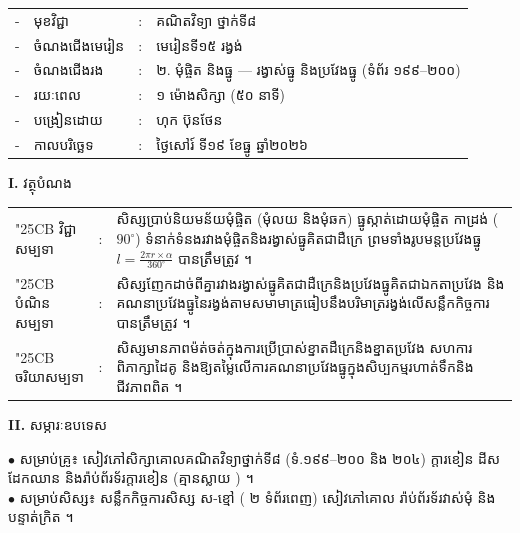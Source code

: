 \documentclass[a4paper,10pt]{article}
\newcommand{\wcirc}{{\symfont\char"25CB}}
\begin{document}
{\fontsize{10pt}{15.0pt}\selectfont
\hspace*{3.7cm}%
\begin{tabular}{@{}l l l l@{}}
  - & មុខវិជ្ជា & : & គណិតវិទ្យា ថ្នាក់ទី៨ \\
  - & ចំណងជើងមេរៀន & : & មេរៀនទី១៥ រង្វង់ \\
  - & ចំណងជើងរង & : & ២. មុំផ្ចិត និងធ្នូ — រង្វាស់ធ្នូ និងប្រវែងធ្នូ (ទំព័រ ១៩៩--២០០) \\
  - & រយៈពេល & : & ១ ម៉ោងសិក្សា (៥០ នាទី) \\
  - & បង្រៀនដោយ & : & ហុក ប៊ុនថែន \\
  - & កាលបរិច្ឆេទ & : & ថ្ងៃសៅរ៍ ទី១៩ ខែធ្នូ ឆ្នាំ២០២៦ \\
\end{tabular}

\vspace{1pt}

\textbf{I.} {\muol វត្ថុបំណង}\\[1pt]
\hspace*{0.55cm}%
\begin{tabular}{@{}l l L{14.2cm}@{}}
  \wcirc \hspace{0.25cm} វិជ្ជាសម្បទា & : & សិស្សប្រាប់និយមន័យមុំផ្ចិត (មុំលយ និងមុំឆក) ធ្នូស្កាត់ដោយមុំផ្ចិត កាដ្រង់ ($90^\circ$) ទំនាក់ទំនងរវាងមុំផ្ចិតនិងរង្វាស់ធ្នូគិតជាដឺក្រេ ព្រមទាំងរូបមន្តប្រវែងធ្នូ $l = \frac{2\pi r \times \alpha}{360^\circ}$ បានត្រឹមត្រូវ ។ \\
  \wcirc \hspace{0.25cm} បំណិនសម្បទា & : & សិស្សញែកដាច់ពីគ្នារវាងរង្វាស់ធ្នូគិតជាដឺក្រេនិងប្រវែងធ្នូគិតជាឯកតាប្រវែង និងគណនាប្រវែងធ្នូនៃរង្វង់តាមសមាមាត្រធៀបនឹងបរិមាត្ររង្វង់លើសន្លឹកកិច្ចការបានត្រឹមត្រូវ ។ \\
  \wcirc \hspace{0.25cm} ចរិយាសម្បទា & : & សិស្សមានភាពម៉ត់ចត់ក្នុងការប្រើប្រាស់ខ្នាតដឺក្រេនិងខ្នាតប្រវែង សហការពិភាក្សាដៃគូ និងឱ្យតម្លៃលើការគណនាប្រវែងធ្នូក្នុងសិប្បកម្មរហាត់ទឹកនិងជីវភាពពិត ។ \\
\end{tabular}

\vspace{1pt}

\textbf{II.} {\muol សម្ភារៈឧបទេស}\\[1pt]
\hspace*{0.55cm}\parbox[t]{18.2cm}{$\bullet$ \hspace{0.25cm} សម្រាប់គ្រូ៖ សៀវភៅសិក្សាគោលគណិតវិទ្យាថ្នាក់ទី៨ (ទំ.១៩៩--២០០ និង ២០៤) ក្ដារខៀន ដីស ដែកឈាន និងរ៉ាប់ព័រទ័រក្ដារខៀន (គ្មានស្លាយ ) ។\\
$\bullet$ \hspace{0.25cm} សម្រាប់សិស្ស៖ សន្លឹកកិច្ចការសិស្ស ស-ខ្មៅ ( ២ ទំព័រពេញ) សៀវភៅគោល រ៉ាប់ព័រទ័រវាស់មុំ និងបន្ទាត់ក្រិត ។}

}
\end{document}
